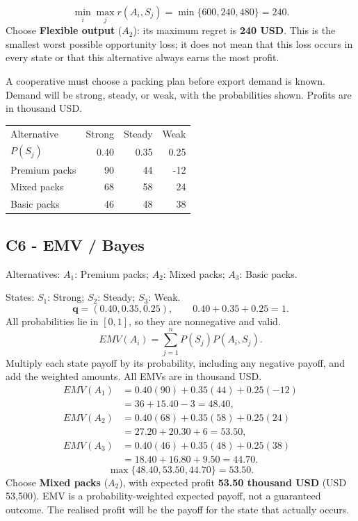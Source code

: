 \[\min_i\max_j r(A_i,S_j)=\min\{600,240,480\}=240.\]
Choose \textbf{Flexible output} ($A_2$): its maximum regret is \textbf{240 USD}. This is the smallest worst possible opportunity loss; it does not mean that this loss occurs in every state or that this alternative always earns the most profit.

\clearpage
{}
A cooperative must choose a packing plan before export demand is known. Demand will be strong, steady, or weak, with the probabilities shown. Profits are in thousand USD.
\begin{center}\small\setlength{\tabcolsep}{4pt}
\begin{tabular}{@{}lrrr@{}}\toprule
Alternative&Strong&Steady&Weak\\
$P(S_j)$&0.40&0.35&0.25\\\midrule
Premium packs&90&44&-12\\
Mixed packs&68&58&24\\
Basic packs&46&48&38\\\bottomrule
\end{tabular}\end{center}
\subsection*{C6 - EMV / Bayes }
\label{sol:fruit-packing-c6}
Alternatives: $A_1$: Premium packs; $A_2$: Mixed packs; $A_3$: Basic packs.\par
States: $S_1$: Strong; $S_2$: Steady; $S_3$: Weak.
\[\boldsymbol{q}=(0.40,0.35,0.25),\qquad 0.40+0.35+0.25=1.\]
All probabilities lie in $[0,1]$, so they are nonnegative and valid.
\[EMV(A_i)=\sum_{j=1}^{n}P(S_j)P(A_i,S_j).\]
Multiply each state payoff by its probability, including any negative payoff, and add the weighted amounts. All EMVs are in thousand USD.
\begin{align*}
EMV(A_1)&=0.40(90)+0.35(44)+0.25(-12)\\&=36+15.40-3=48.40,\\
EMV(A_2)&=0.40(68)+0.35(58)+0.25(24)\\&=27.20+20.30+6=53.50,\\
EMV(A_3)&=0.40(46)+0.35(48)+0.25(38)\\&=18.40+16.80+9.50=44.70.
\end{align*}
\[\max\{48.40,53.50,44.70\}=53.50.\]
Choose \textbf{Mixed packs} ($A_2$), with expected profit \textbf{53.50 thousand USD} (USD 53,500). EMV is a probability-weighted expected payoff, not a guaranteed outcome. The realised profit will be the payoff for the state that actually occurs.


